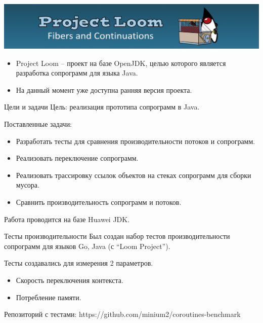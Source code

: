 \begin{frame}
	\includegraphics[scale=0.5]{images/loom.jpg}
	\begin{itemize}
		\item Project Loom – проект на базе OpenJDK, целью которого является разработка сопрограмм для языка Java. 
		\item На данный момент уже доступна ранняя версия проекта.
	\end{itemize}
\end{frame}

\begin{frame}{Цели и задачи}
	Цель: реализация прототипа сопрограмм в Java.
	\par
	Поставленные задачи:
	\begin{itemize}
		\item Разработать тесты для сравнения производительности потоков и сопрограмм.
		\item Реализовать переключение сопрограмм.
		\item Реализовать трассировку ссылок объектов на стеках сопрограмм для сборки мусора.
		\item Сравнить производительность сопрограмм и потоков. 
	\end{itemize}
	Работа проводится на базе Huawei JDK.
\end{frame}

\begin{frame}{Тесты производительности}
	Был создан набор тестов производительности сопрограмм для языков Go, Java (с “Loom Project”).
	
	Тесты создавались для измерения 2 параметров.
	\begin{itemize}
		\item Скорость переключения контекста.
		\item Потребление памяти.
	\end{itemize}
	Репозиторий с тестами: https://github.com/minium2/coroutines-benchmark
\end{frame}

